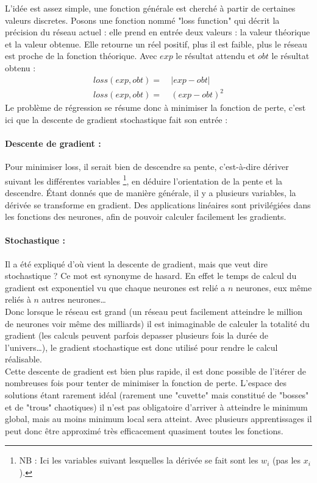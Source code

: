 L'idée est assez simple, une fonction générale est cherché à partir de certaines valeurs discretes.
Posons une fonction nommé "loss function" qui décrit la précision du réseau actuel :
elle prend en entrée deux valeurs : la valeur théorique et la valeur obtenue.
Elle retourne un réel positif, plus il est faible, plus le réseau est proche de la fonction théorique.
\exemle
{
Avec $exp$ le résultat attendu et $obt$ le résultat obtenu :
\begin{align*}
    loss(exp, obt) = &\ |exp - obt| \\
    loss(exp, obt) = &\ (exp - obt)^2
\end{align*}
}
Le problème de régression se résume donc à minimiser la fonction de perte,
c'est ici que la descente de gradient stochastique fait son entrée :


\paragraph{Descente de gradient :}
Pour minimiser loss, il serait bien de descendre sa pente, c'est-à-dire dériver suivant les différentes variables
\footnote{\textsc{NB :} Ici les variables suivant lesquelles la dérivée se fait sont les $w_i$ (pas les $x_i$).},
en déduire l'orientation de la pente et la descendre.
Étant donnés que de manière générale, il y a plusieurs variables, la dérivée se transforme en gradient.
Des applications linéaires sont privilégiées dans les fonctions des neurones,
afin de pouvoir calculer facilement les gradients.\\


\paragraph{Stochastique :}
Il a été expliqué d'où vient la descente de gradient, mais que veut dire stochastique ?
Ce mot est synonyme de hasard.
En effet le temps de calcul du gradient est exponentiel vu que chaque neurones est relié a $n$ neurones,
eux même reliés à $n$ autres neurones\ldots\\
Donc lorsque le réseau est grand
(un réseau peut facilement atteindre le million de neurones voir même des milliards\cite{i3espectrum})
il est inimaginable de calculer la totalité du gradient (les calculs peuvent parfois depasser
plusieurs fois la durée de l'univers\ldots),
le gradient stochastique est donc utilisé pour rendre le calcul réalisable.\\


Cette descente de gradient est bien plus rapide, il est donc possible de l'itérer de nombreuses fois
pour tenter de minimiser la fonction de perte.
L'espace des solutions étant rarement idéal
(rarement une "cuvette" mais constitué de "bosses" et de "trous" chaotiques)
il n'est pas obligatoire d'arriver à atteindre le minimum global, mais au moins minimum local sera atteint.
Avec plusieurs apprentissages il peut donc être approximé très efficacement quasiment toutes les fonctions.
